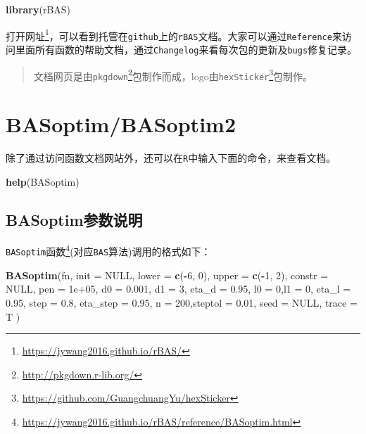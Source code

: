 \documentclass[]{ctexbook}
\newenvironment{Shaded}{\begin{snugshade}}{\end{snugshade}}
\newcommand{\KeywordTok}[1]{\textcolor[rgb]{0.13,0.29,0.53}{\textbf{#1}}}
\newcommand{\DataTypeTok}[1]{\textcolor[rgb]{0.13,0.29,0.53}{#1}}
\newcommand{\DecValTok}[1]{\textcolor[rgb]{0.00,0.00,0.81}{#1}}
\newcommand{\FloatTok}[1]{\textcolor[rgb]{0.00,0.00,0.81}{#1}}
\newcommand{\OtherTok}[1]{\textcolor[rgb]{0.56,0.35,0.01}{#1}}
\newcommand{\OperatorTok}[1]{\textcolor[rgb]{0.81,0.36,0.00}{\textbf{#1}}}
\newcommand{\NormalTok}[1]{#1}
\renewcommand{\href}[2]{#2\footnote{\url{#1}}}
\theoremstyle{definition}
\theoremstyle{definition}
\theoremstyle{definition}
\theoremstyle{remark}
\begin{document}
\begin{Shaded}
\begin{Highlighting}[]
\KeywordTok{library}\NormalTok{(rBAS)}
\end{Highlighting}
\end{Shaded}

打开\href{https://jywang2016.github.io/rBAS/}{网址}，可以看到托管在\texttt{github}上的\texttt{rBAS}文档。大家可以通过\texttt{Reference}来访问里面所有函数的帮助文档，通过\texttt{Changelog}来看每次包的更新及\texttt{bugs}修复记录。

\begin{quote}
文档网页是由\href{http://pkgdown.r-lib.org/}{\texttt{pkgdown}}包制作而成，logo由\href{https://github.com/GuangchuangYu/hexSticker}{\texttt{hexSticker}}包制作。
\end{quote}

\section{BASoptim/BASoptim2}\label{basoptim}

除了通过访问函数文档网站外，还可以在\texttt{R}中输入下面的命令，来查看文档。

\begin{Shaded}
\begin{Highlighting}[]
\KeywordTok{help}\NormalTok{(BASoptim)}
\end{Highlighting}
\end{Shaded}

\subsection{BASoptim参数说明}\label{BASparms}

\href{https://jywang2016.github.io/rBAS/reference/BASoptim.html}{\texttt{BASoptim}函数}(对应\texttt{BAS}算法)调用的格式如下：

\begin{Shaded}
\begin{Highlighting}[]
\KeywordTok{BASoptim}\NormalTok{(fn, }
         \DataTypeTok{init =} \OtherTok{NULL}\NormalTok{, }
         \DataTypeTok{lower =} \KeywordTok{c}\NormalTok{(}\OperatorTok{-}\DecValTok{6}\NormalTok{, }\DecValTok{0}\NormalTok{), }\DataTypeTok{upper =} \KeywordTok{c}\NormalTok{(}\OperatorTok{-}\DecValTok{1}\NormalTok{, }\DecValTok{2}\NormalTok{),}
         \DataTypeTok{constr =} \OtherTok{NULL}\NormalTok{, }\DataTypeTok{pen =} \FloatTok{1e+05}\NormalTok{,}
         \DataTypeTok{d0 =} \FloatTok{0.001}\NormalTok{, }\DataTypeTok{d1 =} \DecValTok{3}\NormalTok{, }\DataTypeTok{eta_d =} \FloatTok{0.95}\NormalTok{, }
         \DataTypeTok{l0 =} \DecValTok{0}\NormalTok{,}\DataTypeTok{l1 =} \DecValTok{0}\NormalTok{, }\DataTypeTok{eta_l =} \FloatTok{0.95}\NormalTok{, }
         \DataTypeTok{step =} \FloatTok{0.8}\NormalTok{, }\DataTypeTok{eta_step =} \FloatTok{0.95}\NormalTok{, }
         \DataTypeTok{n =} \DecValTok{200}\NormalTok{,}\DataTypeTok{steptol =} \FloatTok{0.01}\NormalTok{, }
         \DataTypeTok{seed =} \OtherTok{NULL}\NormalTok{, }\DataTypeTok{trace =}\NormalTok{ T )}
\end{Highlighting}
\end{Shaded}
\end{document}

